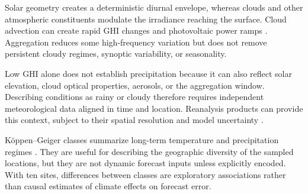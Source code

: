 Solar geometry creates a deterministic diurnal envelope, whereas clouds and
other atmospheric constituents modulate the irradiance reaching the surface.
Cloud advection can create rapid GHI changes and photovoltaic power ramps
\cite{chow2011,chen2020cloudramps}. Aggregation reduces some high-frequency
variation but does not remove persistent cloudy regimes, synoptic variability,
or seasonality.

Low GHI alone does not establish precipitation because it can also reflect
solar elevation, cloud optical properties, aerosols, or the aggregation
window. Describing conditions as rainy or cloudy therefore requires
independent meteorological data aligned in time and location. Reanalysis
products can provide this context, subject to their spatial resolution and
model uncertainty \cite{hersbach2020,copernicus2026era5}.

K{\"o}ppen--Geiger classes summarize long-term temperature and precipitation
regimes \cite{beck2018}. They are useful for describing the geographic
diversity of the sampled locations, but they are not dynamic forecast inputs
unless explicitly encoded. With ten sites, differences between classes are
exploratory associations rather than causal estimates of climate effects on
forecast error.
